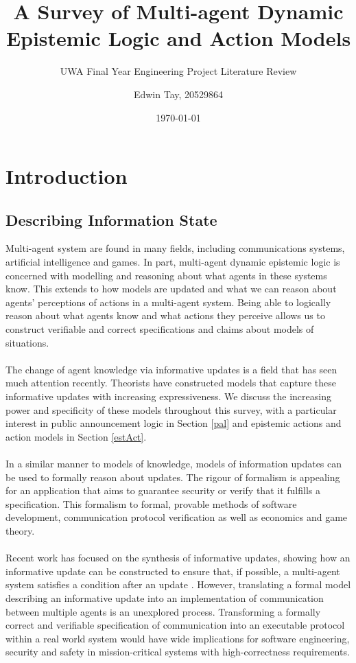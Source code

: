 \documentclass[12pt, a4paper, titlepage]{scrartcl}
\begin{document}
\title{A Survey of Multi-agent Dynamic Epistemic Logic and Action Models}
\subtitle{UWA Final Year Engineering Project Literature Review}
\author{Edwin Tay, 20529864}
\date{\today}

\maketitle

\pagebreak

\tableofcontents

\vfill
\pagebreak

\section{Introduction}\label{intro}
\subsection{Describing Information State}\label{intro_infoState}
Multi-agent system are found in many fields, including communications systems,
artificial intelligence and games.
In part, multi-agent dynamic epistemic logic is concerned with modelling and reasoning
about what agents in these systems know.
This extends to how models are updated and what we can reason about agents'
perceptions of actions in a multi-agent system.
Being able to logically reason about what agents know and what actions they perceive
allows us to construct verifiable and correct specifications and claims about
models of situations.\\
\\
The change of agent knowledge via informative updates is a field that has seen
much attention recently.
Theorists have constructed models that capture these informative updates with
increasing expressiveness.
We discuss the increasing power and specificity of these models throughout this
survey, with a particular interest in public announcement logic in Section
\ref{pal} and epistemic actions and action models in Section \ref{estAct}. \\
\\
In a similar manner to models of knowledge, models of information updates can be
used to formally reason about updates.
The rigour of formalism is appealing for an application that aims to guarantee
security or verify that it fulfills a specification.
This formalism to formal, provable methods of software development,
communication protocol verification as well as economics and game theory.\\
\\
Recent work has focused on the synthesis of informative updates, showing how an
informative update can be constructed to ensure that, if possible, a multi-agent system
satisfies a condition after an update \cite{hales13synthesis}.
However, translating a formal model describing an informative update into an
implementation of communication between multiple agents is an unexplored
process.
Transforming a formally correct and verifiable specification of
communication into an executable protocol within a real world system would have
wide implications for software engineering, security and safety in
mission-critical systems with high-correctness requirements.
\end{document}
